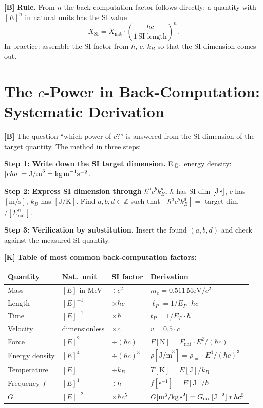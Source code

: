 \textbf{[B]} \textbf{Rule.} From $n$ the back-computation factor follows
directly: a quantity with $[E]^n$ in natural units has the SI value
\[
  X_\text{SI} = X_\text{nat}\cdot\left(\frac{\hbar c}{1\,\text{SI-length}}\right)^n.
\]
In practice: assemble the SI factor from $\hbar$, $c$, $k_B$ so that the SI
dimension comes out.

\section{The $c$-Power in Back-Computation: Systematic Derivation}

\textbf{[B]} The question ``which power of $c$?'' is answered from the SI
dimension of the target quantity. The method in three steps:

\textbf{Step 1: Write down the SI target dimension.}
E.g.\ energy density: $[\rho]=\text{J/m}^3=\text{kg\,m}^{-1}\text{s}^{-2}$.

\textbf{Step 2: Express SI dimension through $\hbar^a c^b k_B^d$.}
$\hbar$ has SI dim $[\text{J\,s}]$, $c$ has $[\text{m/s}]$, $k_B$ has $[\text{J/K}]$.
Find $a,b,d\in\mathbb Z$ such that $[\hbar^a c^b k_B^d]=$ target dim$/[E_\text{nat}^n]$.

\textbf{Step 3: Verification by substitution.}
Insert the found $(a,b,d)$ and check against the measured SI quantity.

\textbf{[K]} \textbf{Table of most common back-computation factors:}

\begin{center}
\renewcommand{\arraystretch}{1.35}
{\small\setlength\tabcolsep{4pt}
\begin{tabular}{lllp{4.5cm}}
\toprule
Quantity & Nat.\ unit & SI factor & Derivation \\
\midrule
Mass & $[E]$ in MeV & $\div c^2$ & $m_e=0{.}511\,\text{MeV}/c^2$ \\
Length & $[E]^{-1}$ & $\times\hbar c$ & $\ell_P=1/E_P\cdot\hbar c$ \\
Time & $[E]^{-1}$ & $\times\hbar$ & $t_P=1/E_P\cdot\hbar$ \\
Velocity & dimensionless & $\times c$ & $v=0{.}5\cdot c$ \\
Force & $[E]^2$ & $\div(\hbar c)$ & $F[\text{N}]=F_\text{nat}\cdot E^2/(\hbar c)$ \\
Energy density & $[E]^4$ & $\div(\hbar c)^3$ & $\rho[\text{J/m}^3]=\rho_\text{nat}\cdot E^4/(\hbar c)^3$ \\
Temperature & $[E]$ & $\div k_B$ & $T[\text{K}]=E[\text{J}]/k_B$ \\
Frequency $f$ & $[E]^1$ & $\div\hbar$ & $f[\text{s}^{-1}]=E[\text{J}]/\hbar$ \\
$G$ & $[E]^{-2}$ & $\times\hbar c^5$ & $G[\text{m}^3/\text{kg\,s}^2]=G_\text{nat}[\text{J}^{-2}]\cdot\hbar c^5$ \\
\bottomrule
\end{tabular}
}
\renewcommand{\arraystretch}{1.0}
\end{center}

